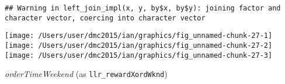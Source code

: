 \documentclass[10pt]{report}
\newenvironment{Shaded}{}{}
\newcommand{\KeywordTok}[1]{\textcolor[rgb]{0.00,0.44,0.13}{\textbf{{#1}}}}
\newcommand{\DataTypeTok}[1]{\textcolor[rgb]{0.56,0.13,0.00}{{#1}}}
\newcommand{\StringTok}[1]{\textcolor[rgb]{0.25,0.44,0.63}{{#1}}}
\newcommand{\NormalTok}[1]{{#1}}
\begin{document}
\begin{Shaded}
\end{Shaded}

\begin{verbatim}
## Warning in left_join_impl(x, y, by$x, by$y): joining factor and character vector, coercing into character vector
\end{verbatim}

\begin{Shaded}
\end{Shaded}

\begin{center}\texttt{[image: /Users/user/dmc2015/ian/graphics/fig\_unnamed-chunk-27-1]} \texttt{[image: /Users/user/dmc2015/ian/graphics/fig\_unnamed-chunk-27-2]} \texttt{[image: /Users/user/dmc2015/ian/graphics/fig\_unnamed-chunk-27-3]} \end{center}

\emph{orderTimeWeekend} (as \texttt{llr\_rewardXordWknd})
\end{document}
